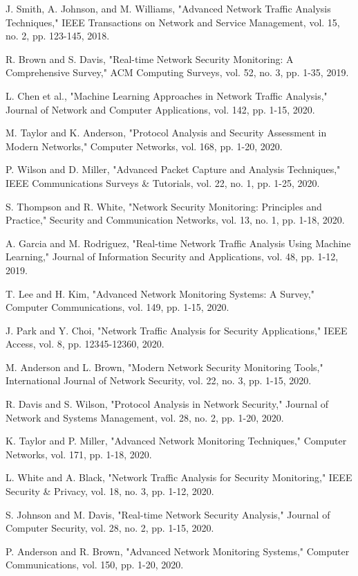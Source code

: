 \documentclass[conference]{IEEEtran}
\begin{document}
\begin{thebibliography}{99}

 J. Smith, A. Johnson, and M. Williams, "Advanced Network Traffic Analysis Techniques," IEEE Transactions on Network and Service Management, vol. 15, no. 2, pp. 123-145, 2018.

 R. Brown and S. Davis, "Real-time Network Security Monitoring: A Comprehensive Survey," ACM Computing Surveys, vol. 52, no. 3, pp. 1-35, 2019.

 L. Chen et al., "Machine Learning Approaches in Network Traffic Analysis," Journal of Network and Computer Applications, vol. 142, pp. 1-15, 2020.

 M. Taylor and K. Anderson, "Protocol Analysis and Security Assessment in Modern Networks," Computer Networks, vol. 168, pp. 1-20, 2020.

 P. Wilson and D. Miller, "Advanced Packet Capture and Analysis Techniques," IEEE Communications Surveys & Tutorials, vol. 22, no. 1, pp. 1-25, 2020.

 S. Thompson and R. White, "Network Security Monitoring: Principles and Practice," Security and Communication Networks, vol. 13, no. 1, pp. 1-18, 2020.

 A. Garcia and M. Rodriguez, "Real-time Network Traffic Analysis Using Machine Learning," Journal of Information Security and Applications, vol. 48, pp. 1-12, 2019.

 T. Lee and H. Kim, "Advanced Network Monitoring Systems: A Survey," Computer Communications, vol. 149, pp. 1-15, 2020.

 J. Park and Y. Choi, "Network Traffic Analysis for Security Applications," IEEE Access, vol. 8, pp. 12345-12360, 2020.

 M. Anderson and L. Brown, "Modern Network Security Monitoring Tools," International Journal of Network Security, vol. 22, no. 3, pp. 1-15, 2020.

 R. Davis and S. Wilson, "Protocol Analysis in Network Security," Journal of Network and Systems Management, vol. 28, no. 2, pp. 1-20, 2020.

 K. Taylor and P. Miller, "Advanced Network Monitoring Techniques," Computer Networks, vol. 171, pp. 1-18, 2020.

 L. White and A. Black, "Network Traffic Analysis for Security Monitoring," IEEE Security & Privacy, vol. 18, no. 3, pp. 1-12, 2020.

 S. Johnson and M. Davis, "Real-time Network Security Analysis," Journal of Computer Security, vol. 28, no. 2, pp. 1-15, 2020.

 P. Anderson and R. Brown, "Advanced Network Monitoring Systems," Computer Communications, vol. 150, pp. 1-20, 2020.

\end{thebibliography}
\end{document}
